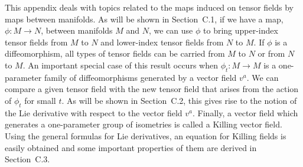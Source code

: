 
This appendix deals with topics related to the maps induced on tensor fields by maps
between manifolds. As will be shown in Section~C.1, if we have a map,
\(\phi:M\to N\), between manifolds \(M\) and \(N\), we can use \(\phi\) to bring
upper-index tensor fields from \(M\) to \(N\) and lower-index tensor fields from
\(N\) to \(M\). If \(\phi\) is a diffeomorphism, all types of tensor fields can be
carried from \(M\) to \(N\) or from \(N\) to \(M\). An important special case of this
result occurs when \(\phi_t:M\to M\) is a one-parameter family of diffeomorphisms
generated by a vector field \(v^a\). We can compare a given tensor field with the new
tensor field that arises from the action of \(\phi_t\) for small \(t\). As will be shown
in Section~C.2, this gives rise to the notion of the Lie derivative with respect to
the vector field \(v^a\). Finally, a vector field which generates a one-parameter
group of isometries is called a Killing vector field. Using the general formulas for
Lie derivatives, an equation for Killing fields is easily obtained and some important
properties of them are derived in Section~C.3.
